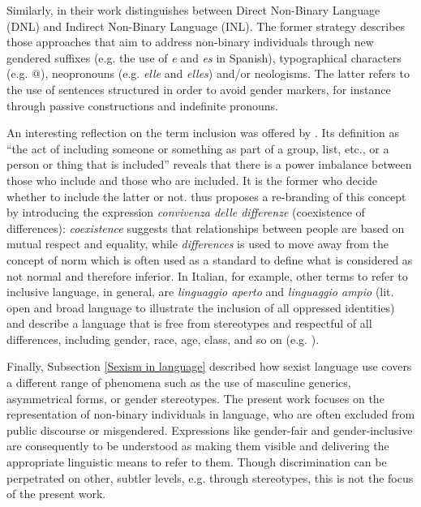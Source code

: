 Similarly, in their work \textcite{lopez2019tu} distinguishes between Direct Non-Binary Language (DNL) and Indirect Non-Binary Language (INL). The former strategy describes those approaches that aim to address non-binary individuals through new gendered suffixes (e.g. the use of \textit{e} and \textit{es} in Spanish), typographical characters (e.g. @), neopronouns (e.g. \textit{elle} and \textit{elles}) and/or neologisms. The latter refers to the use of sentences structured in order to avoid gender markers, for instance through passive constructions and indefinite pronouns. 

An interesting reflection on the term inclusion was offered by \textcite[121]{acanfora2021in}. Its definition as ``the act of including someone or something as part of a group, list, etc., or a person or thing that is included'' \citep{cambridgeinclusion} reveals that there is a power imbalance between those who include and those who are included. It is the former who decide whether to include the latter or not. \textcite[125f]{acanfora2021in} thus proposes a re-branding of this concept by introducing the expression \textit{convivenza delle differenze} (coexistence of differences): \textit{coexistence} suggests that relationships between people are based on mutual respect and equality, while \textit{differences} is used to move away from the concept of norm which is often used as a standard to define what is considered as not normal and therefore inferior. In Italian, for example, other terms to refer to inclusive language, in general, are \textit{linguaggio aperto} and \textit{linguaggio ampio} (lit. open and broad language to illustrate the inclusion of all oppressed identities) and describe a language that is free from stereotypes and respectful of all differences, including gender, race, age, class, and so on (e.g. \cite{gheno2022questione}).

Finally, Subsection \ref{Sexism in language} described how sexist language use covers a different range of phenomena such as the use of masculine generics, asymmetrical forms, or gender stereotypes. The present work focuses on the representation of non-binary individuals in language, who are often excluded from public discourse or misgendered. Expressions like gender-fair and gender-inclusive are consequently to be understood as making them visible and delivering the appropriate linguistic means to refer to them. Though discrimination can be perpetrated on other, subtler levels, e.g. through stereotypes, this is not the focus of the present work. 

